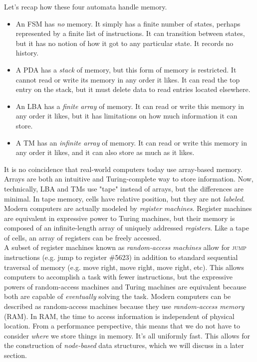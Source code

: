 Let's recap how these four automata handle memory.

\begin{itemize}
	\item An FSM has \textit{no} memory. It simply has a finite number of states, perhaps represented by a finite list of instructions. It can transition between states, but it has no notion of how it got to any particular state. It records no history.
	\item A PDA has a \textit{stack} of memory, but this form of memory is restricted. It cannot read or write its memory in any order it likes. It can read the top entry on the stack, but it must delete data to read entries located elsewhere.
	\item An LBA has a \textit{finite array} of memory. It can read or write this memory in any order it likes, but it has limitations on how much information it can store.
	\item A TM has an \textit{infinite array} of memory. It can read or write this memory in any order it likes, and it can also store as much as it likes.
\end{itemize}

It is no coincidence that real-world computers today use array-based memory. Arrays are both an intuitive and Turing-complete way to store information. Now, technically, LBA and TMs use "tape" instead of arrays, but the differences are minimal. In tape memory, cells have relative position, but they are not \textit{labeled}. Modern computers are actually modeled by \textit{register machines}. Register machines are equivalent in expressive power to Turing machines, but their memory is composed of an infinite-length array of uniquely addressed \textit{registers}. Like a tape of cells, an array of registers can be freely accessed. \\

A subset of register machines known as \textit{random-access machines} allow for \textsc{jump} instructions (e.g. jump to register \#5623) in addition to standard sequential traversal of memory (e.g. move right, move right, move right, etc). This allows computers to accomplish a task with fewer instructions, but the expressive powers of random-access machines and Turing machines are equivalent because both are capable of \textit{eventually} solving the task. Modern computers can be described as random-access machines because they use \textit{random-access memory} (RAM). In RAM, the time to access information is independent of physical location. From a performance perspective, this means that we do not have to consider \textit{where} we store things in memory. It's all uniformly fast. This allows for the construction of \textit{node-based} data structures, which we will discuss in a later section. \\\\

